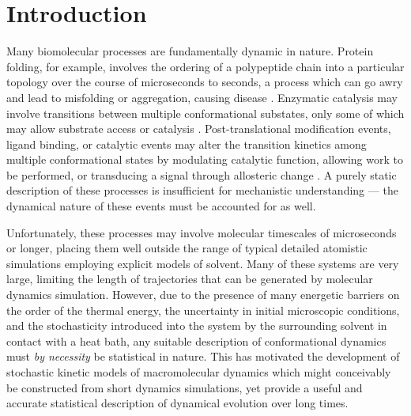 \section{Introduction}


Many biomolecular processes are fundamentally dynamic in nature.
Protein folding, for example, involves the ordering of a polypeptide chain into a particular topology over the course of microseconds to seconds, a process which can go awry and lead to misfolding or aggregation, causing disease \cite{dobson:nature:2003:misfolding}.
Enzymatic catalysis may involve transitions between multiple conformational substates, only some of which may allow substrate access or catalysis \cite{kern:science:2002,youngblood:jbc:2006a,boehr:2006a}.
Post-translational modification events, ligand binding, or catalytic events may alter the transition kinetics among multiple conformational states by modulating catalytic function, allowing work to be performed, or transducing a signal through allosteric change \cite{frauenfelder:pnas:2001,changeux:2005a,maki:jbc:2006a}.
A purely static description of these processes is insufficient for mechanistic understanding --- the dynamical nature of these events must be accounted for as well.

Unfortunately, these processes may involve molecular timescales of microseconds or longer, placing them well outside the range of typical detailed atomistic simulations employing explicit models of solvent.
Many of these systems are very large, limiting the length of trajectories that can be generated by molecular dynamics simulation.
However, due to the presence of many energetic barriers on the order of the thermal energy, the uncertainty in initial microscopic conditions, and the stochasticity introduced into the system by the surrounding solvent in contact with a heat bath, any suitable description of conformational dynamics must \emph{by necessity} be statistical in nature.
This has motivated the development of stochastic kinetic models of macromolecular dynamics which might conceivably be constructed from short dynamics simulations, yet provide a useful and accurate statistical description of dynamical evolution over long times. 

